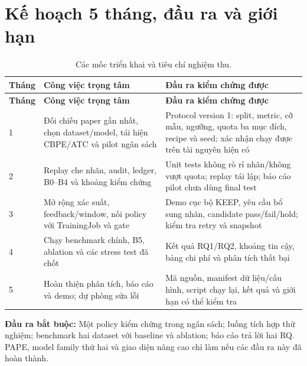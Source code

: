 \section{Kế hoạch 5 tháng, đầu ra và giới hạn}
\begin{xltabular}{\linewidth}{@{}L{1.1cm} Y Y@{}}
\caption{Các mốc triển khai và tiêu chí nghiệm thu.}\label{tab:schedule}\\
\toprule\textbf{Tháng} & \textbf{Công việc trọng tâm} & \textbf{Đầu ra kiểm chứng được} \\
\midrule\endfirsthead
\toprule\textbf{Tháng} & \textbf{Công việc trọng tâm} & \textbf{Đầu ra kiểm chứng được} \\
\midrule{} & Đối chiếu paper gần nhất, chọn dataset/model, tái hiện CBPE/ATC và pilot ngân sách & Protocol version 1: split, metric, cỡ mẫu, ngưỡng, quota ba mục đích, recipe và seed; xác nhận chạy được trên tài nguyên hiện có \\
2 & Replay che nhãn, audit, ledger, B0--B4 và khoảng kiểm chứng & Unit tests không rò rỉ nhãn/không vượt quota; replay tái lập; báo cáo pilot chưa dùng final test \\
3 & Mở rộng xác suất, feedback/window, nối policy với TrainingJob và gate & Demo cục bộ KEEP, yêu cầu bổ sung nhãn, candidate pass/fail/hold; kiểm tra retry và snapshot \\
4 & Chạy benchmark chính, B5, ablation và các stress test đã chốt & Kết quả RQ1/RQ2, khoảng tin cậy, bảng chi phí và phân tích thất bại \\
5 & Hoàn thiện phân tích, báo cáo và demo; dự phòng sửa lỗi & Mã nguồn, manifest dữ liệu/cấu hình, script chạy lại, kết quả và giới hạn có thể kiểm tra \\
\bottomrule
\end{xltabular}

\textbf{Đầu ra bắt buộc:} Một policy kiểm chứng trong ngân sách; luồng tích hợp thử nghiệm; benchmark hai dataset với baseline và ablation; báo cáo trả lời hai RQ. PAPE, model family thứ hai và giao diện nâng cao chỉ làm nếu các đầu ra này đã hoàn thành.

